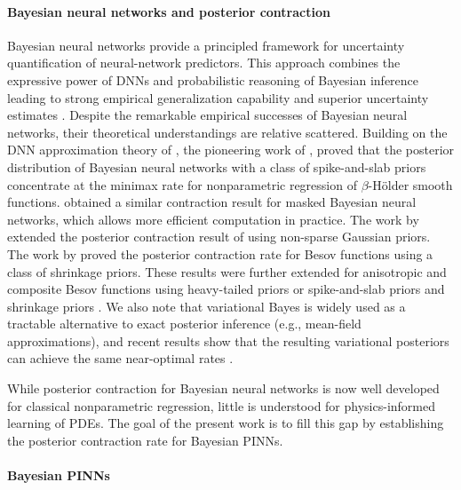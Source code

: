 \documentclass{article}
\theoremstyle{plain}
\theoremstyle{definition}
\theoremstyle{remark}
\begin{document}
\paragraph{Bayesian neural networks and posterior contraction}
 Bayesian neural networks \cite{mackay1995probable,neal1995bayesian} provide a principled framework for uncertainty quantification of neural-network predictors. This approach combines the  expressive power of DNNs and  probabilistic reasoning of  Bayesian inference leading to strong  empirical generalization capability and superior uncertainty estimates \cite{izmailov2021bayesian,wilson2020bayesian}.  Despite the remarkable empirical successes of Bayesian neural networks, their theoretical understandings are relative scattered. Building on the DNN approximation theory of \cite{schmidt2020nonparametric}, the pioneering work of  \cite{polson2018posterior},  proved that the posterior distribution of Bayesian neural networks with a class of spike-and-slab priors concentrate at the minimax rate for nonparametric regression of $\beta$-H\"older smooth functions.   \cite{kong2023masked}  obtained a similar contraction result for masked Bayesian
neural networks, which allows more efficient computation in practice. The work by  \cite{kong2025posterior} extended the posterior contraction result of \cite{polson2018posterior} using non-sparse Gaussian priors.  The work by \cite{lee2022asymptotic} proved the posterior contraction rate for Besov functions using a class of shrinkage priors. These results were further extended for anisotropic and composite Besov functions   using heavy-tailed priors \cite{egels2025posterior} or spike-and-slab priors and shrinkage priors \cite{lee2025posterior}. We also note that variational Bayes \cite{blei2017variational} is widely used as a tractable alternative to exact posterior inference (e.g., mean-field approximations), and recent results show that the resulting variational posteriors can achieve the same near-optimal rates \cite{cherief2020convergence,bai2020efficient,ohn2024adaptive}.

While posterior contraction for Bayesian neural networks is now well developed for classical nonparametric regression, little is understood for  physics-informed learning of PDEs.   The  goal of the present work is to fill this gap by  establishing the posterior contraction  rate for Bayesian  PINNs.
 
\paragraph{Bayesian PINNs}   
\end{document}
